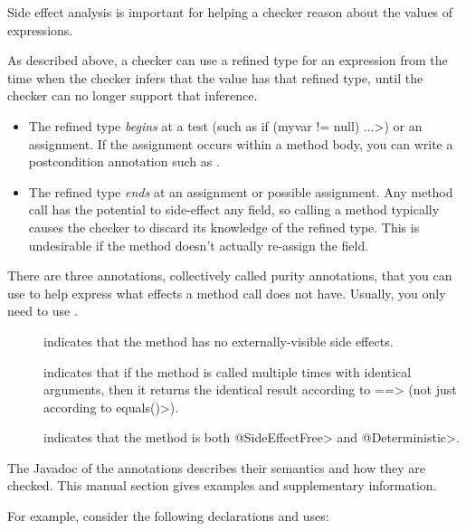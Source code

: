 Side effect analysis is important for helping a checker reason about the
values of expressions.

As described above, a checker can use a refined type for an expression from
the time when the checker infers that the value has that refined type,
until the checker can no longer support that inference.

\begin{itemize}
\item
  The refined type \emph{begins} at a test (such as \<if (myvar != null)
  ...>) or an assignment.  If the assignment occurs within a method body,
  you can write a postcondition annotation such as
  .
\item
  The refined type \emph{ends} at an assignment or possible assignment.
  Any method call has the potential to side-effect any field, so calling a
  method typically causes the checker to discard its knowledge of the
  refined type.  This is undesirable if the method doesn't actually
  re-assign the field.
\end{itemize}

There are three annotations, collectively called purity annotations, that
you can use to help express what effects a method call does not have.
Usually, you only need to use .


\begin{description}

\item[]
  indicates that the method has no externally-visible side effects.

\item[]
  indicates that if the method is called multiple times with identical
  arguments, then it returns the identical result according to \<==>
  (not just according to \<equals()>).

\item[]
  indicates that the method is both \<@SideEffectFree> and \<@Deterministic>.

\end{description}

The Javadoc of the annotations describes their semantics and how they are
checked.  This manual section gives examples and supplementary information.

For example, consider the
following declarations and uses:

